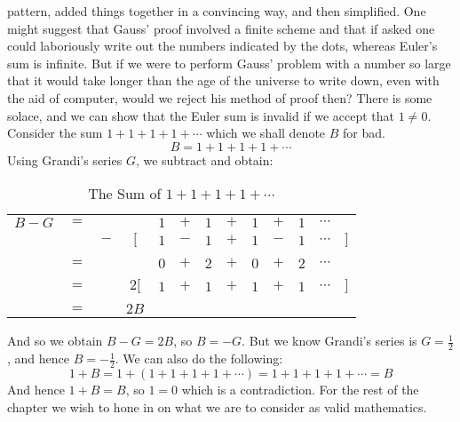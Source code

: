     pattern, added things together in a convincing way, and then simplified. One
    might suggest that Gauss' proof involved a finite scheme and that if asked
    one could laboriously write out the numbers indicated by the dots, whereas
    Euler's sum is infinite. But if we were to perform Gauss' problem with a
    number so large that it would take longer than the age of the universe to
    write down, even with the aid of computer, would we reject his method of
    proof then? There is some solace, and we can show that the Euler sum is
    invalid if we accept that $1\ne{0}$. Consider the sum $1+1+1+1+\cdots$ which
    we shall denote $B$ for bad.
    \begin{equation}
        B=1+1+1+1+\cdots
    \end{equation}
    Using Grandi's series $G$, we subtract and obtain:
    \begin{table}[H]
        \centering
        \captionsetup{type=table}
        \begin{tabular}{ccccccccccccc}
            $B-G$&$=$&&       &$1$&$+$&$1$&$+$&$1$&$+$&$1$&$\cdots$\\
                 &&$-$&$\Big[$&$1$&$-$&$1$&$+$&$1$&$-$&$1$&$\cdots$&$\Big]$
            \\[1ex]
            \hline\\
                 &$=$&&&$0$&$+$&$2$&$+$&$0$&$+$&$2$&$\cdots$\\[1ex]
            \hline\\
            &$=$&&$2\Big[$&$1$&$+$&$1$&$+$&$1$&$+$&$1$&$\cdots$&$\Big]$
                \\[1ex]
            \hline\\
            &$=$&&$2B$
        \end{tabular}
        \caption{The Sum of $1+1+1+1+\cdots$}
    \end{table}
    And so we obtain $B-G=2B$, so $B=\minus{G}$. But we know Grandi's series is
    $G=\frac{1}{2}$, and hence $B=\minus\frac{1}{2}$. We can also do the
    following:
    \begin{equation}
        1+B=1+(1+1+1+1+\cdots)=1+1+1+1+\cdots=B
    \end{equation}
    And hence $1+B=B$, so $1=0$ which is a contradiction. For the rest of the
    chapter we wish to hone in on what we are to consider as valid mathematics.
